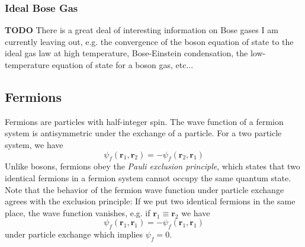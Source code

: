 \documentclass[11pt, a4paper]{article}
\begin{document}
\begin{itemize}
	\subsubsection{Ideal Bose Gas} 
	\textbf{TODO} There is a great deal of interesting information on Bose gases I am currently leaving out, e.g. the convergence of the boson equation of state to the ideal gas law at high temperature, Bose-Einstein condensation, the low-temperature equation of state for a boson gas, etc...
\end{itemize}

\subsection{Fermions}
Fermions are particles with half-integer spin. The wave function of a fermion system is antisymmetric under the exchange of a particle. For a two particle system, we have
\begin{equation*}
	\psi_{f}(\bm{r}_{1}, \bm{r}_{2}) = -\psi_{f}(\bm{r}_{2}, \bm{r}_{1})
\end{equation*}
Unlike bosons, fermions obey the \textit{Pauli exclusion principle}, which states that two identical fermions in a fermion system cannot occupy the same quantum state. Note that the behavior of the fermion wave function under particle exchange agrees with the exclusion principle: If we put two identical fermions in the same place, the wave function vanishes, e.g. if $ \bm{r}_{1} \equiv \bm{r}_{2} $ we have
\begin{equation*}
	\psi_{f}(\bm{r}_{1}, \bm{r}_{1}) = - \psi_{f}(\bm{r}_{1}, \bm{r}_{1})
\end{equation*}
under particle exchange which implies $ \psi_{f} = 0 $.
\end{document}
